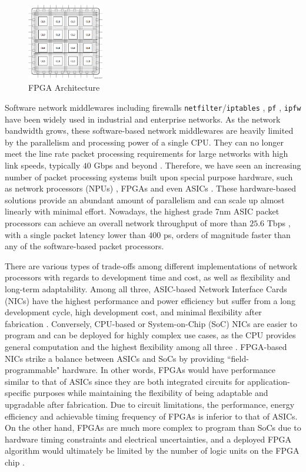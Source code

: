 \documentclass[a4paper]{report}
\newcommand{\code}{\texttt}
\begin{document}
\begin{figure}[h!]
  \centering
  \includegraphics[width=0.3\textwidth]{imgs/fpga-arch.png}
  \caption{FPGA Architecture \cite{xilinx-fpga}}
  \label{fig:fpga-arch}
\end{figure}

Software network middlewares including firewalls \code{netfilter}/\code{iptables} \cite{netfilter-iptables}, \code{pf} \cite{pf}, \code{ipfw} \cite{ipfw} have been widely used in industrial and enterprise networks. As the network bandwidth grows, these software-based network middlewares are heavily limited by the parallelism and processing power of a single CPU. They can no longer meet the line rate packet processing requirements for large networks with high link speeds, typically $40$ Gbps and beyond \cite{fiessler-2016}. Therefore, we have seen an increasing number of packet processing systems built upon special purpose hardware, such as network processors (NPUs) \cite {qi-2007, duo-2006}, FPGAs\cite{hager-2014, fong-2012, jiang-2009, jiang-2009-large} and even ASICs \cite{bosshart-2013}. These hardware-based solutions provide an abundant amount of parallelism and can scale up almost linearly with minimal effort. Nowadays, the highest grade 7nm ASIC packet processors can achieve an overall network throughput of more than $25.6$ Tbps \cite{tomahawk-2021}, with a single packet latency lower than $400$ ps, orders of magnitude faster than any of the software-based packet processors.

There are various types of trade-offs among different implementations of network processors with regards to development time and cost, as well as flexibility and long-term adaptability. Among all three, ASIC-based Network Interface Cards (NICs) have the highest performance and power efficiency but suffer from a long development cycle, high development cost, and minimal flexibility after fabrication \cite{amara-2006, deierling-2018}. Conversely, CPU-based or System-on-Chip (SoC) NICs are easier to program and can be deployed for highly complex use cases, as the CPU provides general computation and the highest flexibility among all three \cite{deierling-2018}. FPGA-based NICs strike a balance between ASICs and SoCs by providing ``field-programmable" hardware. In other words, FPGAs would have performance similar to that of ASICs since they are both integrated circuits for application-specific purposes while maintaining the flexibility of being adaptable and upgradable after fabrication. Due to circuit limitations, the performance, energy efficiency and achievable timing frequency of FPGAs is inferior to that of ASICs. On the other hand, FPGAs are much more complex to program than SoCs due to hardware timing constraints and electrical uncertainties, and a deployed FPGA algorithm would ultimately be limited by the number of logic units on the FPGA chip \cite{deierling-2018}.
\end{document}
